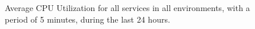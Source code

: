 \begin{figure}[!htbp]
    \centering
    \caption[AWS ECS Advanced Monitoring Example]{Average CPU Utilization for all services in all environments, with a period of 5 minutes, during the last 24 hours.}
    \label{fig:ecs-example-01}
\end{figure} 
      